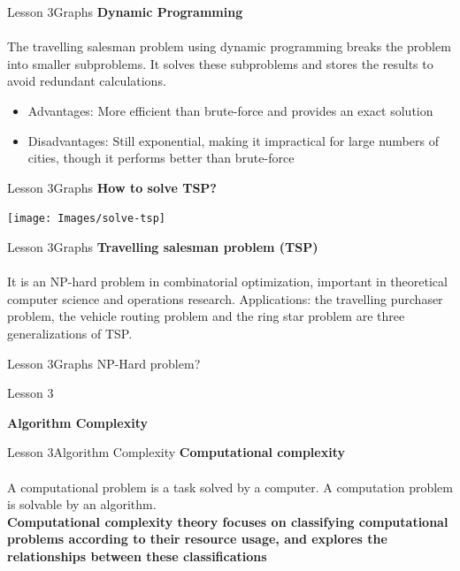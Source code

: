 \documentclass[aspectratio=1610]{beamer}
\begin{document}
\begin{frame}{Lesson 3}{Graphs}
\LARGE
\textbf{Dynamic Programming}\\~\\
\Large
The travelling salesman problem using dynamic programming breaks the
problem into smaller subproblems. It solves these subproblems and
stores the results to avoid redundant calculations.
\begin{itemize}
	\item Advantages: More efficient than brute-force and provides an exact solution
	\item Disadvantages:  Still exponential, making it impractical for large numbers of cities, though it performs better than brute-force
\end{itemize}
\end{frame}


\begin{frame}{Lesson 3}{Graphs}
\LARGE
\textbf{How to solve TSP?}\\
\begin{center}
\texttt{[image: Images/solve-tsp]}
\end{center}
\end{frame}


\begin{frame}{Lesson 3}{Graphs}
\LARGE
\textbf{Travelling salesman problem (TSP)}\\~\\
\Large
It is an \alert{NP-hard} problem in combinatorial optimization,
important in theoretical computer science and operations research.
Applications: the travelling purchaser problem, the vehicle routing
problem and the ring star problem are three generalizations of TSP.
\end{frame}



\begin{frame}{Lesson 3}{Graphs}
\Huge
NP-Hard problem?
\end{frame}


\begin{frame}{Lesson 3}{}
\begin{center}
\Huge \textbf{Algorithm Complexity}
\end{center}
\end{frame}


\begin{frame}{Lesson 3}{Algorithm Complexity}
\LARGE
\textbf{Computational complexity}\\~\\
\Large
A computational problem is a task solved by a computer. A
computation problem is solvable by an algorithm.\\
\textbf{Computational complexity theory focuses on classifying
computational problems according to their resource usage, and
explores the relationships between these classifications}
\end{frame}
 
\end{document}
